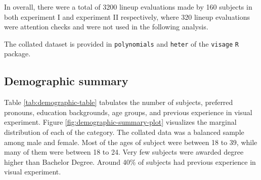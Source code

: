 \documentclass[]{interact}
\theoremstyle{plain}%
\theoremstyle{definition}
\theoremstyle{remark}
\begin{document}
In overall, there were a total of 3200 lineup evaluations made by 160
subjects in both experiment I and experiment II respectively, where 320
lineup evaluations were attention checks and were not used in the
following analysis.

The collated dataset is provided in \texttt{polynomials} and
\texttt{heter} of the \texttt{visage} \texttt{R} package.

\hypertarget{demographic-summary}{%
\subsection{Demographic summary}\label{demographic-summary}}

Table \ref{tab:demographic-table} tabulates the number of subjects,
preferred pronouns, education backgrounds, age groups, and previous
experience in visual experiment. Figure
\ref{fig:demographic-summary-plot} visualizes the marginal distribution
of each of the category. The collated data was a balanced sample among
male and female. Most of the ages of subject were between 18 to 39,
while many of them were between 18 to 24. Very few subjects were awarded
degree higher than Bachelor Degree. Around 40\% of subjects had previous
experience in visual experiment.
\end{document}

